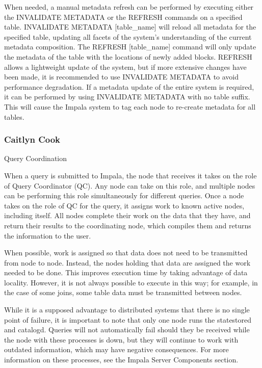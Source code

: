 \documentclass[onecolumn, draftclsnofoot,10pt, compsoc]{IEEEtran}
\begin{document}
When needed, a manual metadata refresh can be performed by executing either the INVALIDATE METADATA or the REFRESH commands on a specified table.
INVALIDATE METADATA [table\_name] will reload all metadata for the specified table, updating all facets of the system’s understanding of the current metadata composition.
The REFRESH [table\_name] command will only update the metadata of the table with the locations of newly added blocks.
REFRESH allows a lightweight update of the system, but if more extensive changes have been made, it is recommended to use INVALIDATE METADATA to avoid performance degradation.
If a metadata update of the entire system is required, it can be performed by using INVALIDATE METADATA with no table suffix.
This will cause the Impala system to tag each node to re-create metadata for all tables.

\subsubsection{Caitlyn Cook}

Query Coordination

When a query is submitted to Impala, the node that receives it takes on the role of Query Coordinator (QC).
Any node can take on this role, and multiple nodes can be performing this role simultaneously for different queries.
Once a node takes on the role of QC for the query, it assigns work to known active nodes, including itself. 
All nodes complete their work on the data that they have, and return their results to the coordinating node, which compiles them and returns the information to the user. 

When possible, work is assigned so that data does not need to be transmitted from node to node. 
Instead, the nodes holding that data are assigned the work needed to be done. 
This improves execution time by taking advantage of data locality. 
However, it is not always possible to execute in this way; for example, in the case of some joins, some table data must be transmitted between nodes. 

While it is a supposed advantage to distributed systems that there is no single point of failure, it is important to note that only one node runs the statestored and catalogd. 
Queries will not automatically fail should they be received while the node with these processes is down, but they will continue to work with outdated information, which may have negative consequences. 
For more information on these processes, see the Impala Server Components section. 
\end{document}
